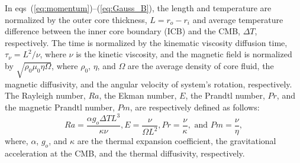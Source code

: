 In eqs~(\ref{eq:momentum})--(\ref{eq:Gauss_B}), the length and temperature are normalized by the outer core thickness, $L = r_{o} - r_{i}$ and average temperature difference between the inner core boundary (ICB) and the CMB, $\Delta T$, respectively. 
The time is normalized by the kinematic viscosity diffusion time, $\tau_{\nu}  = L^{2} / \nu$, where $\nu$ is the kinetic viscosity, and the magnetic field is normalized by $\sqrt{\rho_{0} \mu_{0} \eta \Omega}$, where $\rho_{0}$, $\eta$, and $\Omega$ are the average density of core fluid, the magnetic diffusivity, and the angular velocity of system's rotation, respectively.
The Rayleigh number, $Ra$, the Ekman number, $E$, the Prandtl number, $Pr$, and the magnetic Prandtl number, $Pm$, are respectively defined as follows:
%
\begin{equation}
Ra = \displaystyle{ \frac{\alpha g_o \Delta T L^{3}}{ \kappa \nu} }, 
E  = \displaystyle{ \frac{\nu}{\Omega L^{2}} },
Pr = \displaystyle{ \frac{\nu}{\kappa} }, 
\mbox{ and }
Pm = \displaystyle{ \frac{\nu}{\eta} },
\label{eq:dimensionless}
\end{equation}
%
where, $\alpha$, $g_o$, and $\kappa$ are the thermal expansion coefficient, the gravitational acceleration at the CMB, and the thermal diffusivity, respectively.

